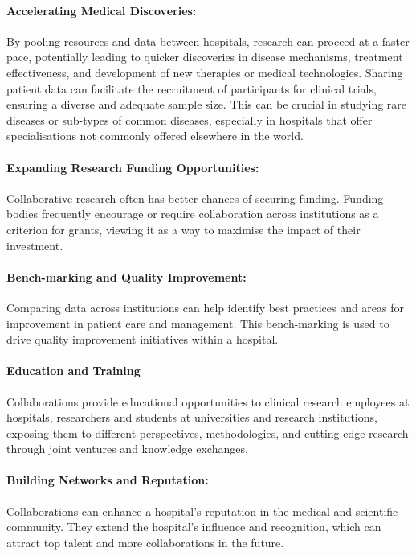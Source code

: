 \documentclass[11pt]{article}
\begin{document}
\paragraph{Accelerating Medical Discoveries:}
By pooling resources and data between hospitals, research can proceed at a faster pace\cite{app11020796}, potentially leading to quicker discoveries in disease mechanisms, treatment effectiveness, and development of new therapies or medical technologies. Sharing patient data can facilitate the recruitment of participants for clinical trials, ensuring a diverse and adequate sample size. This can be crucial in studying rare diseases or sub-types of common diseases, especially in hospitals that offer specialisations not commonly offered elsewhere in the world. 

\paragraph{Expanding Research Funding Opportunities:} Collaborative research often has better chances of securing funding\cite{Vasan2021}. Funding bodies frequently encourage or require collaboration across institutions as a criterion for grants, viewing it as a way to maximise the impact of their investment.

\paragraph{Bench-marking and Quality Improvement:} Comparing data across institutions can help identify best practices and areas for improvement in patient care and management. This bench-marking is used to drive quality improvement initiatives within a hospital\cite{Werner2005}.

\paragraph{Education and Training} Collaborations provide educational opportunities to clinical research employees at hospitals, researchers and students at universities and research institutions, exposing them to different perspectives, methodologies, and cutting-edge research through joint ventures and knowledge exchanges.

\paragraph{Building Networks and Reputation:} Collaborations can enhance a hospital’s reputation in the medical and scientific community\cite{Vasan2021}. They extend the hospital’s influence and recognition, which can attract top talent and more collaborations in the future.
\end{document}

